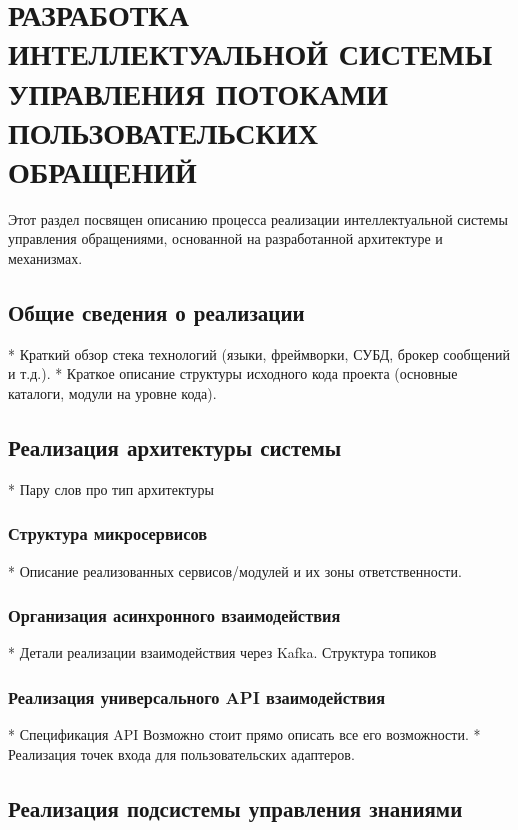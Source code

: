 \section{РАЗРАБОТКА ИНТЕЛЛЕКТУАЛЬНОЙ СИСТЕМЫ УПРАВЛЕНИЯ ПОТОКАМИ ПОЛЬЗОВАТЕЛЬСКИХ ОБРАЩЕНИЙ}
\label{sec:development}

Этот раздел посвящен описанию процесса реализации интеллектуальной системы управления обращениями, основанной на разработанной архитектуре и механизмах.

\subsection{Общие сведения о реализации}

*   Краткий обзор стека технологий (языки, фреймворки, СУБД, брокер сообщений и т.д.).
*   Краткое описание структуры исходного кода проекта (основные каталоги, модули на уровне кода).

\subsection{Реализация архитектуры системы}

*   Пару слов про тип архитектуры

\subsubsection{Структура микросервисов}

*   Описание реализованных сервисов/модулей и их зоны ответственности.

\subsubsection{Организация асинхронного взаимодействия}

*   Детали реализации взаимодействия через Kafka. Структура топиков

\subsubsection{Реализация универсального API взаимодействия}

*   Спецификация API Возможно стоит прямо описать все его возможности.
*   Реализация точек входа для пользовательских адаптеров.

\subsection{Реализация подсистемы управления знаниями}

